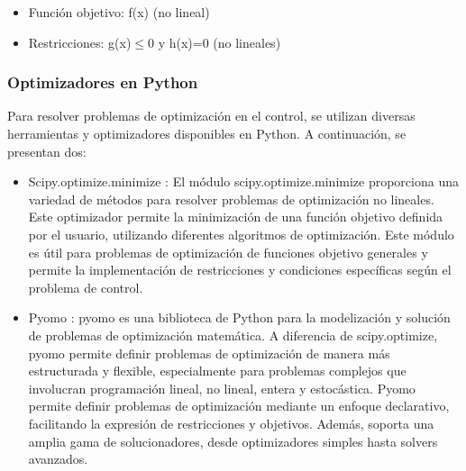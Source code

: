 \begin{itemize}
	\item Función objetivo: f(x) (no lineal)
	\item Restricciones: g(x)$\leq$0 y 	h(x)=0 (no lineales)
\end{itemize}


\subsubsection{Optimizadores en Python}

Para resolver problemas de optimización en el control, se utilizan diversas herramientas y optimizadores disponibles en Python. A continuación, se presentan dos:

\begin{itemize}
	\item Scipy.optimize.minimize \cite{ref31}: El módulo scipy.optimize.minimize proporciona una variedad de métodos para resolver problemas de optimización no lineales. Este optimizador permite la minimización de una función objetivo definida por el usuario, utilizando diferentes algoritmos de optimización. Este módulo es útil para problemas de optimización de funciones objetivo generales y permite la implementación de restricciones y condiciones específicas según el problema de control.
	
	\item Pyomo \cite{ref32,ref33}: pyomo es una biblioteca de Python para la modelización y solución de problemas de optimización matemática. A diferencia de scipy.optimize, pyomo permite definir problemas de optimización de manera más estructurada y flexible, especialmente para problemas complejos que involucran programación lineal, no lineal, entera y estocástica. Pyomo permite definir problemas de optimización mediante un enfoque declarativo, facilitando la expresión de restricciones y objetivos. Además, soporta una amplia gama de solucionadores, desde optimizadores simples hasta solvers avanzados.
	
	
\end{itemize}

